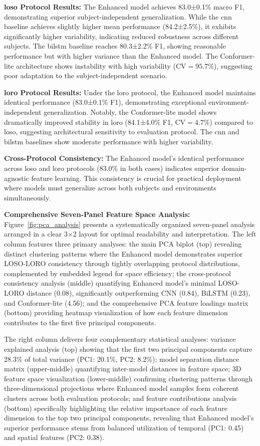 \documentclass[journal]{IEEEtran}
\begin{document}
\textbf{\gls{loso} Protocol Results:} The Enhanced model achieves 83.0±0.1\% macro F1, demonstrating superior subject-independent generalization. While the \gls{cnn} baseline achieves slightly higher mean performance (84.2±2.5\%), it exhibits significantly higher variability, indicating reduced robustness across different subjects. The \gls{bilstm} baseline reaches 80.3±2.2\% F1, showing reasonable performance but with higher variance than the Enhanced model. The Conformer-lite architecture shows instability with high variability ($\text{CV}=95.7\%$), suggesting poor adaptation to the subject-independent scenario.

\textbf{\gls{loro} Protocol Results:} Under the \gls{loro} protocol, the Enhanced model maintains identical performance (83.0±0.1\% F1), demonstrating exceptional environment-independent generalization. Notably, the Conformer-lite model shows dramatically improved stability in \gls{loro} (84.1±4.0\% F1, $\text{CV}=4.7\%$) compared to \gls{loso}, suggesting architectural sensitivity to evaluation protocol. The \gls{cnn} and \gls{bilstm} baselines show moderate performance with higher variability.

\textbf{Cross-Protocol Consistency:} The Enhanced model's identical performance across \gls{loso} and \gls{loro} protocols (83.0\% in both cases) indicates superior domain-agnostic feature learning. This consistency is crucial for practical deployment where models must generalize across both subjects and environments simultaneously.

\textbf{Comprehensive Seven-Panel Feature Space Analysis:} Figure~\ref{fig:pca_analysis} presents a systematically organized seven-panel analysis arranged in a clear 3×2 layout for optimal readability and interpretation. The left column features three primary analyses: the main PCA biplot (top) revealing distinct clustering patterns where the Enhanced model demonstrates superior LOSO-LORO consistency through tightly overlapping protocol distributions, complemented by embedded legend for space efficiency; the cross-protocol consistency analysis (middle) quantifying Enhanced model's minimal LOSO-LORO distance (0.08), significantly outperforming CNN (0.84), BiLSTM (0.23), and Conformer-lite (4.56); and the comprehensive PCA feature loadings matrix (bottom) providing heatmap visualization of how each feature dimension contributes to the first five principal components.

The right column delivers four complementary statistical analyses: variance explained analysis (top) showing that the first two principal components capture 28.3\% of total variance (PC1: 20.1\%, PC2: 8.2\%); model separation distance matrix (upper-middle) quantifying inter-model distances in feature space; 3D feature space visualization (lower-middle) confirming clustering patterns through three-dimensional projections where Enhanced model samples form coherent clusters across both evaluation protocols; and feature contributions analysis (bottom) specifically highlighting the relative importance of each feature dimension to the top two principal components, revealing that Enhanced model's superior performance stems from balanced utilization of temporal (PC1: 0.45) and spatial features (PC2: 0.38).
\end{document}
